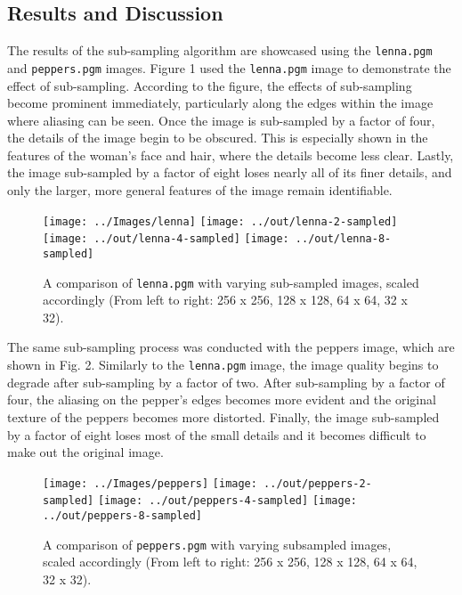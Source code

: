 \documentclass[headings=optiontoheadandtoc,listof=totoc,parskip=full]{scrartcl}
\begin{document}
\subsection{Results and Discussion}
The results of the sub-sampling algorithm are showcased using the \texttt{lenna.pgm} and \texttt{peppers.pgm} images. Figure 1 used the \texttt{lenna.pgm} image to demonstrate the effect of sub-sampling. According to the figure, the effects of sub-sampling become prominent immediately, particularly along the edges within the image where aliasing can be seen. Once the image is sub-sampled by a factor of four, the details of the image begin to be obscured. This is especially shown in the features of the woman’s face and hair, where the details become less clear. Lastly, the image sub-sampled by a factor of eight loses nearly all of its finer details, and only the larger, more general features of the image remain identifiable. 

\begin{figure}[ht]
	\centering
	\texttt{[image: ../Images/lenna]}
	\texttt{[image: ../out/lenna-2-sampled]}
	\texttt{[image: ../out/lenna-4-sampled]}
	\texttt{[image: ../out/lenna-8-sampled]}
	\caption{A comparison of \texttt{lenna.pgm} with varying sub-sampled images, scaled accordingly (From left to right: 256 x 256, 128 x 128, 64 x 64, 32 x 32).}
	\label{fig:equal-result-2}
\end{figure}

The same sub-sampling process was conducted with the peppers image, which are shown in Fig. 2. Similarly to the \texttt{lenna.pgm} image, the image quality begins to degrade after sub-sampling by a factor of two. After sub-sampling by a factor of four, the aliasing on the pepper’s edges becomes more evident and the original texture of the peppers becomes more distorted. Finally, the image sub-sampled by a factor of eight loses most of the small details and it becomes difficult to make out the original image.

\begin{figure}[ht]
	\centering
	\texttt{[image: ../Images/peppers]}
	\texttt{[image: ../out/peppers-2-sampled]}
	\texttt{[image: ../out/peppers-4-sampled]}
	\texttt{[image: ../out/peppers-8-sampled]}
	\caption{A comparison of \texttt{peppers.pgm} with varying subsampled images, scaled accordingly (From left to right: 256 x 256, 128 x 128, 64 x 64, 32 x 32).}
	\label{fig:equal-result-2}
\end{figure}
\end{document}
